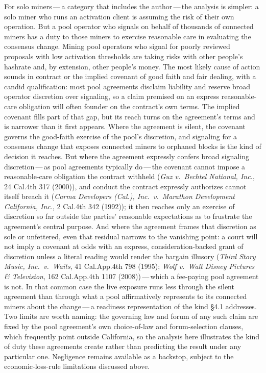 \documentclass[11pt, twoside, openright]{book}
\newcommand{\sect}[1]{\S#1}
\begin{document}
For solo miners\,---\,a category that includes the author\,---\,the analysis is simpler: a solo miner who runs an activation client is assuming the risk of their own operation. But a pool operator who signals on behalf of thousands of connected miners has a duty to those miners to exercise reasonable care in evaluating the consensus change. Mining pool operators who signal for poorly reviewed proposals with low activation thresholds are taking risks with other people's hashrate and, by extension, other people's money. The most likely cause of action sounds in contract or the implied covenant of good faith and fair dealing, with a candid qualification: most pool agreements disclaim liability and reserve broad operator discretion over signaling, so a claim premised on an express reasonable-care obligation will often founder on the contract's own terms. The implied covenant fills part of that gap, but its reach turns on the agreement's terms and is narrower than it first appears. Where the agreement is silent, the covenant governs the good-faith exercise of the pool's discretion, and signaling for a consensus change that exposes connected miners to orphaned blocks is the kind of decision it reaches. But where the agreement expressly confers broad signaling discretion\,---\,as pool agreements typically do\,---\,the covenant cannot impose a reasonable-care obligation the contract withheld (\textit{Guz v.~Bechtel National, Inc.}, 24 Cal.4th 317 (2000)), and conduct the contract expressly authorizes cannot itself breach it (\textit{Carma Developers (Cal.), Inc.~v.~Marathon Development California, Inc.}, 2 Cal.4th 342 (1992)); it then reaches only an exercise of discretion so far outside the parties' reasonable expectations as to frustrate the agreement's central purpose. And where the agreement frames that discretion as sole or unfettered, even that residual narrows to the vanishing point: a court will not imply a covenant at odds with an express, consideration-backed grant of discretion unless a literal reading would render the bargain illusory (\textit{Third Story Music, Inc.~v.~Waits}, 41 Cal.App.4th 798 (1995); \textit{Wolf v.~Walt Disney Pictures \& Television}, 162 Cal.App.4th 1107 (2008))\,---\,which a fee-paying pool agreement is not. In that common case the live exposure runs less through the silent agreement than through what a pool affirmatively represents to its connected miners about the change\,---\,a readiness representation of the kind \sect{4.1} addresses. Two limits are worth naming: the governing law and forum of any such claim are fixed by the pool agreement's own choice-of-law and forum-selection clauses, which frequently point outside California, so the analysis here illustrates the kind of duty these agreements create rather than predicting the result under any particular one. Negligence remains available as a backstop, subject to the economic-loss-rule limitations discussed above.
\end{document}
